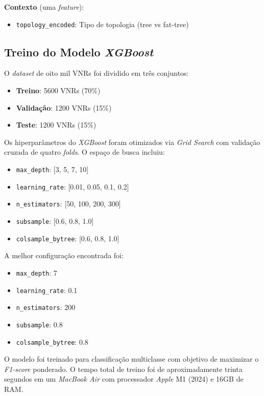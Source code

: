 \documentclass[conference]{IEEEtran}
\begin{document}
\textbf{Contexto} (uma \textit{feature}):
\begin{itemize}
    \item \texttt{topology\_encoded}: Tipo de topologia (tree vs fat-tree)
\end{itemize}

\subsection{Treino do Modelo \textit{XGBoost}}

O \textit{dataset} de oito mil VNRs foi dividido em três conjuntos:
\begin{itemize}
    \item \textbf{Treino}: 5600 VNRs (70\%)
    \item \textbf{Validação}: 1200 VNRs (15\%)
    \item \textbf{Teste}: 1200 VNRs (15\%)
\end{itemize}

Os hiperparâmetros do \textit{XGBoost} foram otimizados via \textit{Grid Search} com validação cruzada de quatro \textit{folds}. O espaço de busca incluiu:

\begin{itemize}
    \item \texttt{max\_depth}: [3, 5, 7, 10]
    \item \texttt{learning\_rate}: [0.01, 0.05, 0.1, 0.2]
    \item \texttt{n\_estimators}: [50, 100, 200, 300]
    \item \texttt{subsample}: [0.6, 0.8, 1.0]
    \item \texttt{colsample\_bytree}: [0.6, 0.8, 1.0]
\end{itemize}

A melhor configuração encontrada foi:
\begin{itemize}
    \item \texttt{max\_depth}: 7
    \item \texttt{learning\_rate}: 0.1
    \item \texttt{n\_estimators}: 200
    \item \texttt{subsample}: 0.8
    \item \texttt{colsample\_bytree}: 0.8
\end{itemize}

O modelo foi treinado para classificação multiclasse com objetivo de maximizar o \textit{F1-score} ponderado. O tempo total de treino foi de aproximadamente trinta segundos em um \textit{MacBook Air} com processador \textit{Apple} M1 (2024) e 16GB de RAM.
\end{document}
